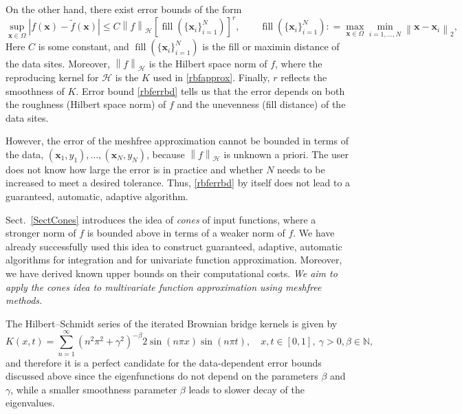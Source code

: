 \documentclass[11pt]{NSFamsart}
\newcommand{\tf}{\tilde{f}}
\newcommand{\bx}{{\boldsymbol{x}}}
\newcommand{\cx}{{\Omega}}
\def\abs#1{\ensuremath{\left \lvert #1 \right \rvert}}
\newcommand{\norm}[2][{}]{\ensuremath{\left \lVert #2 \right \rVert}_{#1}}
\DeclareMathOperator{\filldis}{fill}
\newcommand{\desn}{\{\bx_i\}_{i=1}^N}
\newcommand{\ch}{\mathcal{H}}
\begin{document}
On the other hand, there exist error bounds of the form \citep{Wen05a}
\begin{equation} \label{rbferrbd}
\sup_{\bx \in \cx} \abs{f(\bx) - \tf(\bx)} \le C \norm[\ch]{f} [\filldis(\desn)]^r, \qquad \filldis(\desn): = \max_{\bx \in \cx} \min_{i=1,  \ldots, N} \norm[2]{\bx - \bx_i},
\end{equation}
Here $C$ is some constant, and $\filldis(\{\bx_i\}_{i=1}^N)$ is the fill or maximin distance of the data sites.  Moreover, $\norm[\ch]{f}$ is the Hilbert space norm of $f$, where the reproducing kernel for $\ch$ is the $K$ used in \eqref{rbfapprox}. Finally, $r$ reflects the smoothness of $K$.  Error bound \eqref{rbferrbd} tells us that the error depends on both the roughness (Hilbert space norm) of $f$ and the unevenness (fill distance) of the data sites.

However, the error of the meshfree approximation cannot be bounded in terms of the data, $(\bx_1, y_1), \ldots, (\bx_N,y_N)$, because $\norm[\ch]{f}$ is unknown a priori.  The user does not know how large the error is in practice and whether $N$ needs to be increased to meet a desired tolerance. Thus, \eqref{rbferrbd} by itself does not lead to a guaranteed, automatic, adaptive algorithm.

Sect.\ \ref{SectCones} introduces the idea of \emph{cones} of input functions, where a stronger norm of $f$ is bounded above in terms of a weaker norm of $f$.  We have already successfully used this idea to construct guaranteed, adaptive, automatic algorithms for integration and for univariate function approximation.  Moreover, we have derived known upper bounds on their computational costs. \emph{We aim to apply the cones idea to multivariate function approximation using meshfree methods.}

The Hilbert--Schmidt series of the iterated Brownian bridge kernels \citep{CavorettoEtAl14} is given by
\begin{equation}\label{IBBkernel}
K(x,t) = \sum_{n=1}^{\infty} \left(n^2\pi^2 + \gamma^2\right)^{-\beta} 2\sin(n\pi x) \sin(n\pi t), \quad x,t \in [0,1],\ \gamma>0, \beta \in \mathbb{N},
\end{equation}
and therefore it is a perfect candidate for the data-dependent error bounds discussed above since the eigenfunctions do not depend on the parameters $\beta$ and $\gamma$, while a smaller smoothness parameter $\beta$ leads to slower decay of the eigenvalues.
\end{document}
